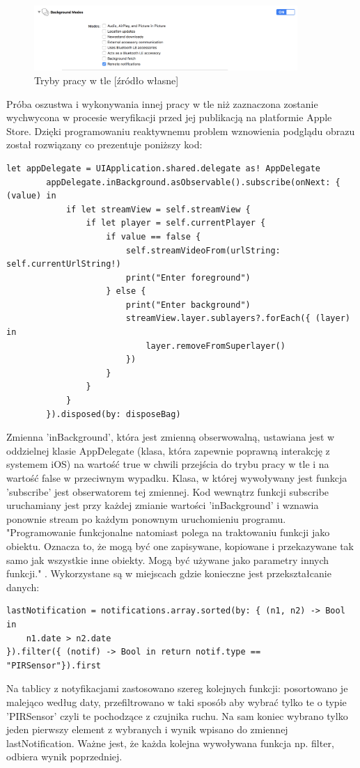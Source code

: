 \begin{figure}[ht]
	\centering
	\includegraphics[width=10cm]{ios_screenshots/backgroundModes.png}
	\caption{Tryby pracy w tle [źródło własne]}
\end{figure}
Próba oszustwa i wykonywania innej pracy w tle niż zaznaczona zostanie wychwycona w procesie weryfikacji przed jej publikacją na platformie Apple Store. Dzięki programowaniu reaktywnemu problem wznowienia podglądu obrazu został rozwiązany co prezentuje poniższy kod:
\begin{verbatim}
let appDelegate = UIApplication.shared.delegate as! AppDelegate
        appDelegate.inBackground.asObservable().subscribe(onNext: { (value) in
            if let streamView = self.streamView {
                if let player = self.currentPlayer {
                    if value == false {
                        self.streamVideoFrom(urlString: self.currentUrlString!)
                        print("Enter foreground")
                    } else {
                        print("Enter background")
                        streamView.layer.sublayers?.forEach({ (layer) in
                            layer.removeFromSuperlayer()
                        })
                    }
                }
            }
        }).disposed(by: disposeBag)
\end{verbatim}
Zmienna 'inBackground', która jest zmienną obserwowalną, ustawiana jest w oddzielnej klasie AppDelegate (klasa, która zapewnie poprawną interakcję z systemem iOS) na wartość true w chwili przejścia do trybu pracy w tle i na wartość false w przeciwnym wypadku. Klasa, w której wywoływany jest funkcja 'subscribe' jest obserwatorem tej zmiennej. Kod wewnątrz funkcji subscribe uruchamiany jest przy każdej zmianie wartości 'inBackground' i wznawia ponownie stream po każdym ponownym uruchomieniu programu.
"Programowanie funkcjonalne natomiast polega na traktowaniu funkcji jako obiektu. Oznacza to, że mogą być one zapisywane, kopiowane i przekazywane tak samo jak wszystkie inne obiekty. Mogą być używane jako parametry innych funkcji." \cite[p.~172]{proswift}. Wykorzystane są w miejscach gdzie konieczne jest przekształcanie danych:
\begin{verbatim}
lastNotification = notifications.array.sorted(by: { (n1, n2) -> Bool in
	n1.date > n2.date 
}).filter({ (notif) -> Bool in return notif.type == "PIRSensor"}).first
\end{verbatim}
Na tablicy z notyfikacjami zastosowano szereg kolejnych funkcji: posortowano je malejąco według daty, przefiltrowano w taki sposób aby wybrać tylko te o typie 'PIRSensor' czyli te pochodzące z czujnika ruchu. Na sam koniec wybrano tylko jeden pierwszy element z wybranych i wynik wpisano do zmiennej lastNotification. Ważne jest, że każda kolejna wywoływana funkcja np. filter, odbiera wynik poprzedniej. 

